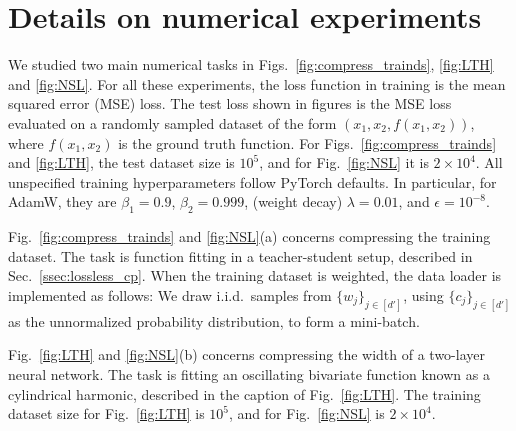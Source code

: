 \documentclass{article}
\theoremstyle{plain}
\newcommand{\supp}{\operatorname{supp}}
\begin{document}





\section{Details on numerical experiments}\label{app:numerical}

We studied two main numerical tasks in Figs.~\ref{fig:compress_trainds}, \ref{fig:LTH} and \ref{fig:NSL}. For all these experiments, the loss function in training is the mean squared error (MSE) loss. The test loss shown in figures is the MSE loss evaluated on a randomly sampled dataset of the form $(x_1, x_2, f(x_1, x_2))$, where $f(x_1, x_2)$ is the ground truth function. For Figs.~\ref{fig:compress_trainds} and \ref{fig:LTH}, the test dataset size is $10^5$, and for Fig.~\ref{fig:NSL} it is $2\times 10^4$. All unspecified training hyperparameters follow PyTorch defaults. In particular, for AdamW, they are $\beta_1 = 0.9$, $\beta_2=0.999$, (weight decay) $\lambda = 0.01$, and $\epsilon = 10^{-8}$. 

Fig.~\ref{fig:compress_trainds} and \ref{fig:NSL}(a) concerns compressing the training dataset. The task is function fitting in a teacher-student setup, described in Sec.~\ref{ssec:lossless_cp}. When the training dataset is weighted, the data loader is implemented as follows: We draw i.i.d.\ samples from $\{w_j\}_{j\in[d']}$, using $\{c_j\}_{j\in[d']}$ as the unnormalized probability distribution, to form a mini-batch. 

Fig.~\ref{fig:LTH} and \ref{fig:NSL}(b) concerns compressing the width of a two-layer neural network. The task is fitting an oscillating bivariate function known as a cylindrical harmonic, described in the caption of Fig.~\ref{fig:LTH}. The training dataset size for Fig.~\ref{fig:LTH} is $10^5$, and for Fig.~\ref{fig:NSL} is $2\times 10^4$. 
\end{document}

